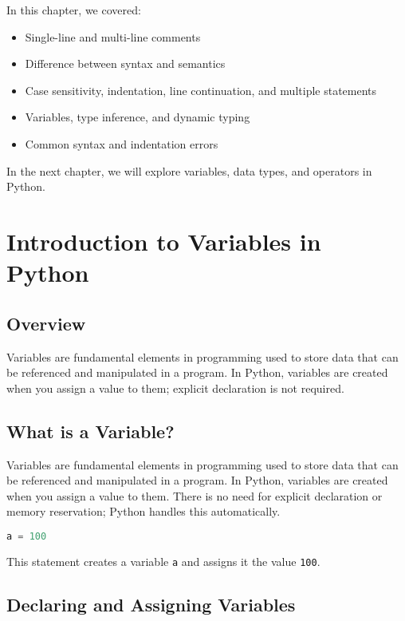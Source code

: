 In this chapter, we covered:

\begin{itemize}
    \item Single-line and multi-line comments
    \item Difference between syntax and semantics
    \item Case sensitivity, indentation, line continuation, and multiple statements
    \item Variables, type inference, and dynamic typing
    \item Common syntax and indentation errors
\end{itemize}

In the next chapter, we will explore variables, data types, and operators in Python.


\chapter{Introduction to Variables in Python}

\section{Overview}

Variables are fundamental elements in programming used to store data that can be referenced and manipulated in a program.  
In Python, variables are created when you assign a value to them; explicit declaration is not required.

\section{What is a Variable?}

Variables are fundamental elements in programming used to store data that can be referenced and manipulated in a program.  
In Python, variables are created when you assign a value to them. There is no need for explicit declaration or memory reservation; Python handles this automatically.

\begin{lstlisting}[language=Python]
a = 100
\end{lstlisting}

This statement creates a variable \texttt{a} and assigns it the value \texttt{100}.

\section{Declaring and Assigning Variables}

